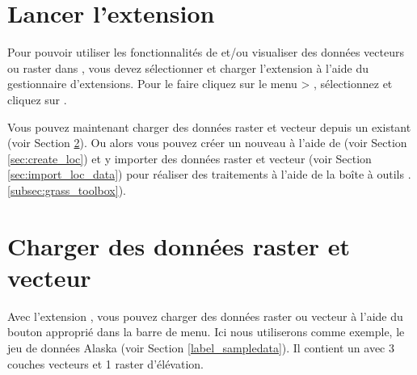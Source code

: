 \section{Lancer l'extension \grass}\label{sec:starting_grass}


Pour pouvoir utiliser les fonctionnalités de \grass et/ou visualiser des données vecteurs ou raster dans \qg, 
vous devez sélectionner et charger l'extension \grass à l'aide du gestionnaire d'extensions. 
Pour le faire cliquez sur le menu  > , 
sélectionnez \dropmenuopt{\grass} et cliquez sur .


Vous pouvez maintenant charger des données raster et vecteur depuis un  \grass existant (voir Section \ref{sec:load_grassdata}). Ou alors vous pouvez créer un nouveau  \grass à l'aide de \qg (voir Section \ref{sec:create_loc}) et y importer des données raster et vecteur (voir Section \ref{sec:import_loc_data}) pour réaliser des traitements à l'aide de la boîte à outils \grass.\ref{subsec:grass_toolbox}).

\section{Charger des données \grass raster et vecteur}\label{sec:load_grassdata}

Avec l'extension \grass, vous pouvez charger des données raster ou vecteur à l'aide  du bouton approprié dans la barre de menu. Ici nous utiliserons comme exemple,  le jeu de données \qg Alaska (voir Section \ref{label_sampledata}).  Il contient un  \grass avec 3 couches vecteurs et 1 raster d'élévation.

